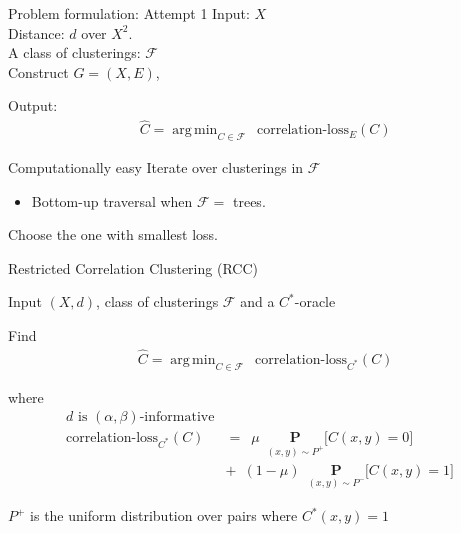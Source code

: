 \documentclass{beamer}
\newcommand{\mc}{\mathcal}
\newcommand{\mb}{\mathbf}
\DeclareMathOperator*{\argmin}{arg\,min}
\begin{document}
\begin{frame}{Problem formulation: Attempt 1}
	Input: $X$\\
	Distance: $d$ over $X^2$.\\
	A class of clusterings: $\mc F$\\
	
	\vspace{20pt}Construct $G = (X, E)$, 
	
	\vspace{10pt}Output: 
	\vspace{-10pt}\begin{align*}
	  &\hat C = \argmin_{C \in \mc F} \enspace \text{correlation-loss}_{E}(C)
	\end{align*}
\end{frame}

\begin{frame}{Computationally easy}	
	Iterate over clusterings in $\mc F$		
	\begin{itemize}
		\vspace{10pt}\item Bottom-up traversal when $\mc F = $ trees.
	\end{itemize}
	\vspace{30pt}Choose the one with smallest loss.
	
\end{frame}


\begin{frame}{Restricted Correlation Clustering (RCC)}
	\begin{block}{Input}
		$(X, d)$, class of clusterings $\mc F$ and a $C^*$-oracle
	\end{block}
	
	\vspace{10pt}\begin{block}{Find}
		\vspace{-15pt}\begin{align*}
		  &\hat C = \argmin_{C \in \mc F} \enspace \text{correlation-loss}_{C^*}(C)
		\end{align*}	
	\end{block}
	
	\begin{block}{where}
		\vspace{-20pt}\begin{align*}
			d \text{ is }(\alpha, \beta)\text{-informative}&\\
			\text{correlation-loss}_{C^*}(C) &= \enspace  \mu \enspace \underset{(x, y) \sim P^+}{\mb P} \big[ C(x, y) = 0 ] \\
			&+\enspace (1-\mu) \enspace \underset{(x, y) \sim P^-}{\mb P} \big[ C(x, y) = 1] 
		\end{align*}
	\end{block}	
	$P^+$ is the uniform distribution over pairs where $C^*(x, y) = 1$
\end{frame}
\end{document}
